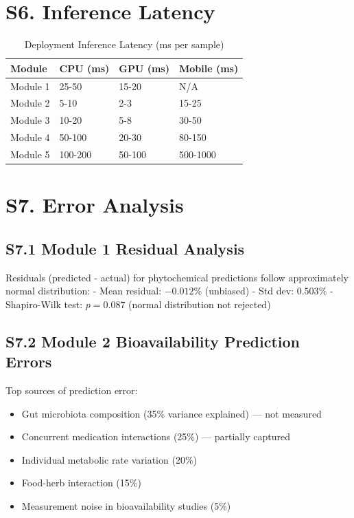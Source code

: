 \documentclass[11pt,a4paper]{article}
\begin{document}
\section{S6. Inference Latency}

\begin{table}[H]
\centering
\caption{Deployment Inference Latency (ms per sample)}
\label{tab:latency}
\begin{tabular}{|l|l|l|l|}
\hline
\textbf{Module} & \textbf{CPU (ms)} & \textbf{GPU (ms)} & \textbf{Mobile (ms)} \\
\hline
Module 1 & 25-50 & 15-20 & N/A \\
\hline
Module 2 & 5-10 & 2-3 & 15-25 \\
\hline
Module 3 & 10-20 & 5-8 & 30-50 \\
\hline
Module 4 & 50-100 & 20-30 & 80-150 \\
\hline
Module 5 & 100-200 & 50-100 & 500-1000 \\
\hline
\end{tabular}
\end{table}

\section{S7. Error Analysis}

\subsection{S7.1 Module 1 Residual Analysis}

Residuals (predicted - actual) for phytochemical predictions follow approximately normal distribution:
- Mean residual: $-0.012\%$ (unbiased)
- Std dev: $0.503\%$
- Shapiro-Wilk test: $p=0.087$ (normal distribution not rejected)

\subsection{S7.2 Module 2 Bioavailability Prediction Errors}

Top sources of prediction error:
\begin{itemize}
    \item Gut microbiota composition (35\% variance explained) — not measured
    \item Concurrent medication interactions (25\%) — partially captured
    \item Individual metabolic rate variation (20\%)
    \item Food-herb interaction (15\%)
    \item Measurement noise in bioavailability studies (5\%)
\end{itemize}
\end{document}
